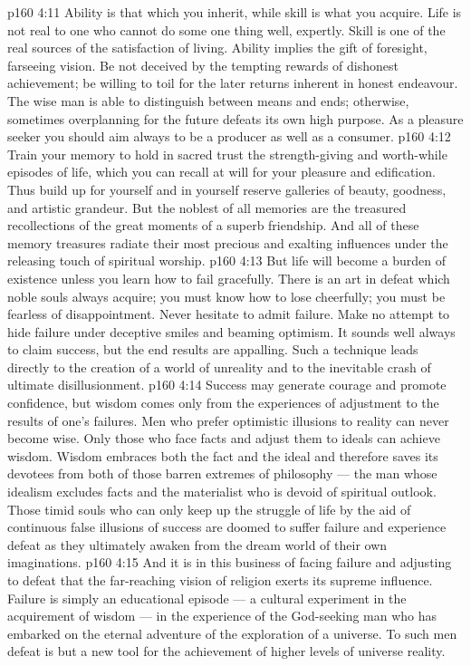 \vs p160 4:11 Ability is that which you inherit, while skill is what you acquire. Life is not real to one who cannot do some one thing well, expertly. Skill is one of the real sources of the satisfaction of living. Ability implies the gift of foresight, farseeing vision. Be not deceived by the tempting rewards of dishonest achievement; be willing to toil for the later returns inherent in honest endeavour. The wise man is able to distinguish between means and ends; otherwise, sometimes overplanning for the future defeats its own high purpose. As a pleasure seeker you should aim always to be a producer as well as a consumer.
\vs p160 4:12 Train your memory to hold in sacred trust the strength\hyp{}giving and worth\hyp{}while episodes of life, which you can recall at will for your pleasure and edification. Thus build up for yourself and in yourself reserve galleries of beauty, goodness, and artistic grandeur. But the noblest of all memories are the treasured recollections of the great moments of a superb friendship. And all of these memory treasures radiate their most precious and exalting influences under the releasing touch of spiritual worship.
\vs p160 4:13 But life will become a burden of existence unless you learn how to fail gracefully. There is an art in defeat which noble souls always acquire; you must know how to lose cheerfully; you must be fearless of disappointment. Never hesitate to admit failure. Make no attempt to hide failure under deceptive smiles and beaming optimism. It sounds well always to claim success, but the end results are appalling. Such a technique leads directly to the creation of a world of unreality and to the inevitable crash of ultimate disillusionment.
\vs p160 4:14 Success may generate courage and promote confidence, but wisdom comes only from the experiences of adjustment to the results of one’s failures. Men who prefer optimistic illusions to reality can never become wise. Only those who face facts and adjust them to ideals can achieve wisdom. Wisdom embraces both the fact and the ideal and therefore saves its devotees from both of those barren extremes of philosophy --- the man whose idealism excludes facts and the materialist who is devoid of spiritual outlook. Those timid souls who can only keep up the struggle of life by the aid of continuous false illusions of success are doomed to suffer failure and experience defeat as they ultimately awaken from the dream world of their own imaginations.
\vs p160 4:15 And it is in this business of facing failure and adjusting to defeat that the far\hyp{}reaching vision of religion exerts its supreme influence. Failure is simply an educational episode --- a cultural experiment in the acquirement of wisdom --- in the experience of the God\hyp{}seeking man who has embarked on the eternal adventure of the exploration of a universe. To such men defeat is but a new tool for the achievement of higher levels of universe reality.
